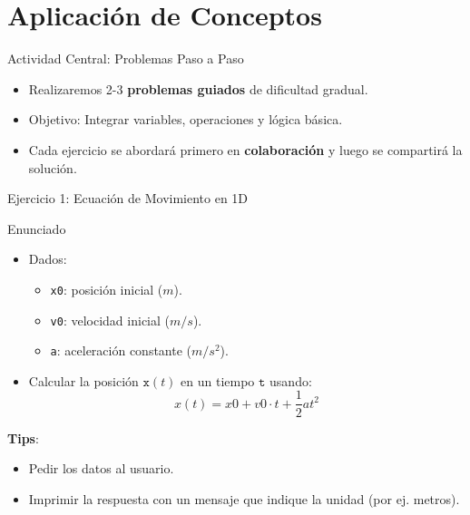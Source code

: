 \documentclass[10pt]{beamer}
\begin{document}
\section{Aplicación de Conceptos}

\begin{frame}{Actividad Central: Problemas Paso a Paso}
  \begin{itemize}
    \item Realizaremos 2-3 \textbf{problemas guiados} de dificultad gradual.
    \item Objetivo: Integrar variables, operaciones y lógica básica.
    \item Cada ejercicio se abordará primero en \textbf{colaboración} y luego se compartirá la solución.
  \end{itemize}
\end{frame}

\begin{frame}{Ejercicio 1: Ecuación de Movimiento en 1D}
  \begin{block}{Enunciado}
    \begin{itemize}
      \item Dados:
        \begin{itemize}
          \item \texttt{x0}: posición inicial (\(m\)).
          \item \texttt{v0}: velocidad inicial (\(m/s\)).
          \item \texttt{a}: aceleración constante (\(m/s^2\)).
        \end{itemize}
      \item Calcular la posición \(\texttt{x}(t)\) en un tiempo \(\texttt{t}\) usando:
        \[
          x(t) = x0 + v0\cdot t + \frac{1}{2} a t^2
        \]
    \end{itemize}
  \end{block}
  \textbf{Tips}:
  \begin{itemize}
    \item Pedir los datos al usuario.
    \item Imprimir la respuesta con un mensaje que indique la unidad (por ej. metros).
  \end{itemize}
\end{frame}
\end{document}
